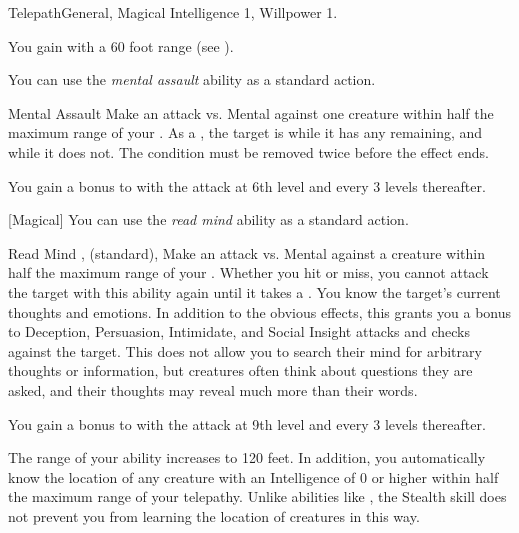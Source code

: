     \begin{feat}{Telepath}{General, Magical}
        \featpre Intelligence 1, Willpower 1.

         You gain  with a 60 foot range (see ).

         You can use the \textit{mental assault} ability as a standard action.
        \begin{durationability}{Mental Assault}
            \rankline
            Make an attack vs. Mental against one creature within half the maximum range of your .
            \hit As a , the target is \dazed while it has any  remaining, and \stunned while it does not.
            \crit The condition must be removed twice before the effect ends.

            \rankline
            You gain a  bonus to  with the attack at 6th level and every 3 levels thereafter.
        \end{durationability}

        [Magical] You can use the \textit{read mind} ability as a standard action.
        \begin{durationability}{Read Mind}
            ,  (standard), 
            \rankline
            Make an attack vs. Mental against a creature within half the maximum range of your .
            Whether you hit or miss, you cannot attack the target with this ability again until it takes a .
            \hit You know the target's current thoughts and emotions.
            In addition to the obvious effects, this grants you a  bonus to Deception, Persuasion, Intimidate, and Social Insight attacks and checks against the target.
            This does not allow you to search their mind for arbitrary thoughts or information, but creatures often think about questions they are asked, and their thoughts may reveal much more than their words.

            \rankline
            You gain a  bonus to  with the attack at 9th level and every 3 levels thereafter.
        \end{durationability}

         The range of your  ability increases to 120 feet.
        In addition, you automatically know the location of any creature with an Intelligence of 0 or higher within half the maximum range of your telepathy.
        Unlike abilities like , the Stealth skill does not prevent you from learning the location of creatures in this way.


\end{feat}

